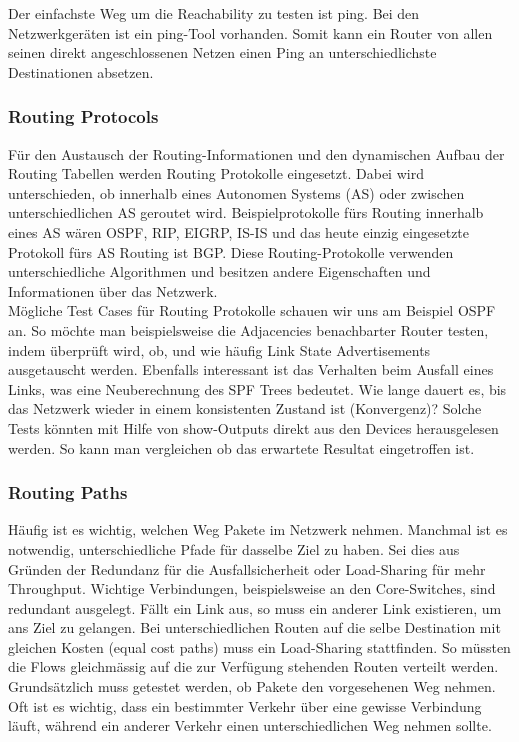 \documentclass[a4,12pt]{scrartcl}
\begin{document}
\noindent Der einfachste Weg um die Reachability zu testen ist ping. Bei den Netzwerkgeräten ist ein ping-Tool vorhanden. Somit kann ein Router von allen seinen direkt angeschlossenen Netzen einen Ping an unterschiedlichste Destinationen absetzen.
\subsubsection{Routing Protocols}
Für den Austausch der Routing-Informationen und den dynamischen Aufbau der Routing Tabellen werden Routing Protokolle eingesetzt. Dabei wird unterschieden, ob innerhalb eines Autonomen Systems (AS) oder zwischen unterschiedlichen AS geroutet wird. Beispielprotokolle fürs Routing innerhalb eines AS wären OSPF, RIP, EIGRP, IS-IS und das heute einzig eingesetzte Protokoll fürs AS Routing ist BGP. Diese Routing-Protokolle verwenden unterschiedliche Algorithmen und besitzen andere Eigenschaften und Informationen über das Netzwerk.\\

\noindent Mögliche Test Cases für Routing Protokolle schauen wir uns am Beispiel OSPF an. So möchte man beispielsweise die Adjacencies benachbarter Router testen, indem überprüft wird, ob, und wie häufig Link State Advertisements ausgetauscht werden. Ebenfalls interessant ist das Verhalten beim Ausfall eines Links, was eine Neuberechnung des SPF Trees bedeutet. Wie lange dauert es, bis das Netzwerk wieder in einem konsistenten Zustand ist (Konvergenz)? Solche Tests könnten mit Hilfe von show-Outputs direkt aus den Devices herausgelesen werden. So kann man vergleichen ob das erwartete Resultat eingetroffen ist. 
\subsubsection{Routing Paths}
Häufig ist es wichtig, welchen Weg Pakete im Netzwerk nehmen. Manchmal ist es notwendig, unterschiedliche Pfade für dasselbe Ziel zu haben. Sei dies aus Gründen der Redundanz für die Ausfallsicherheit oder Load-Sharing für mehr Throughput. Wichtige Verbindungen, beispielsweise an den Core-Switches, sind redundant ausgelegt. Fällt ein Link aus, so muss ein anderer Link existieren, um ans Ziel zu gelangen. Bei unterschiedlichen Routen auf die selbe Destination mit gleichen Kosten (equal cost paths) muss ein Load-Sharing stattfinden. So müssten die Flows gleichmässig auf die zur Verfügung stehenden Routen verteilt werden.\\

\noindent Grundsätzlich muss getestet werden, ob Pakete den vorgesehenen Weg nehmen. Oft ist es wichtig, dass ein bestimmter Verkehr über eine gewisse Verbindung läuft, während ein anderer Verkehr einen unterschiedlichen Weg nehmen sollte.\\
\end{document}
